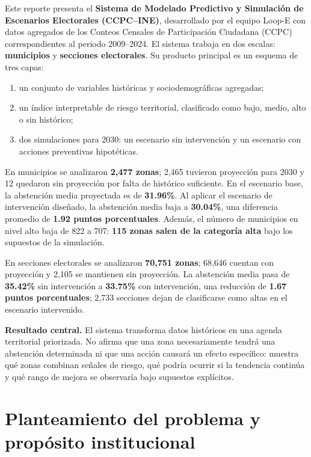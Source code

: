 \documentclass[11pt,a4paper]{article}
\begin{document}
Este reporte presenta el \textbf{Sistema de Modelado Predictivo y Simulación de Escenarios Electorales (CCPC--INE)}, desarrollado por el equipo Loop-E con datos agregados de los Conteos Censales de Participación Ciudadana (CCPC) correspondientes al periodo 2009--2024. El sistema trabaja en dos escalas: \textbf{municipios} y \textbf{secciones electorales}. Su producto principal es un esquema de tres capas:
\begin{enumerate}
    \item un conjunto de variables históricas y sociodemográficas agregadas;
    \item un índice interpretable de riesgo territorial, clasificado como bajo, medio, alto o sin histórico;
    \item dos simulaciones para 2030: un escenario sin intervención y un escenario con acciones preventivas hipotéticas.
\end{enumerate}

En municipios se analizaron \textbf{2,477 zonas}; 2,465 tuvieron proyección para 2030 y 12 quedaron sin proyección por falta de histórico suficiente. En el escenario base, la abstención media proyectada es de \textbf{31.96\%}. Al aplicar el escenario de intervención diseñado, la abstención media baja a \textbf{30.04\%}, una diferencia promedio de \textbf{1.92 puntos porcentuales}. Además, el número de municipios en nivel alto baja de 822 a 707: \textbf{115 zonas salen de la categoría alta} bajo los supuestos de la simulación.

En secciones electorales se analizaron \textbf{70,751 zonas}; 68,646 cuentan con proyección y 2,105 se mantienen sin proyección. La abstención media pasa de \textbf{35.42\%} sin intervención a \textbf{33.75\%} con intervención, una reducción de \textbf{1.67 puntos porcentuales}; 2,733 secciones dejan de clasificarse como altas en el escenario intervenido.

\begin{hallazgo}
\textbf{Resultado central.} El sistema transforma datos históricos en una agenda territorial priorizada. No afirma que una zona necesariamente tendrá una abstención determinada ni que una acción causará un efecto específico: muestra qué zonas combinan señales de riesgo, qué podría ocurrir si la tendencia continúa y qué rango de mejora se observaría bajo supuestos explícitos.
\end{hallazgo}

\section{Planteamiento del problema y propósito institucional}
\end{document}

